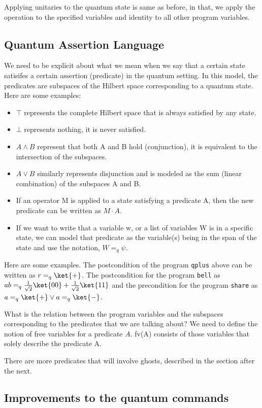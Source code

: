 \documentclass[acmsmall,nonacm,timestamp,review=false,anonymous=false]{acmart}
\begin{document}
Applying unitaries to the quantum state is same as before, in that, we apply the operation to the specified variables and identity to all other program variables.

\subsection{Quantum Assertion Language}
We need to be explicit about what we mean when we say that a certain state satisifes a certain assertion (predicate) in the quantum setting. In this model, the predicates are subspaces of the Hilbert space corresponding to a quantum state. Here are some examples:
\begin{itemize}
	\item $\top$ represents the complete Hilbert space that is always satisfied by any state.
	\item $\bot$ represents nothing, it is never satisfied.
	\item $A \wedge B$ represent that both A and B hold (conjunction), it is equivalent to the intersection of the subspaces.
	\item $A \vee B$ similarly represents disjunction and is modeled as the sum (linear combination) of the subspaces A and B.
	\item If an operator M is applied to a state satisfying a predicate A, then the new predicate can be written as $M \cdot A$.
	\item If we want to write that a variable w, or a list of variables W is in a specific state, we can model that predicate as the variable(s) being in the span of the state and use the notation, $W =_q \psi$.
\end{itemize}

Here are some examples. The postcondition of the program \texttt{qplus} above can be written as $r =_q \ket{+}$. The postcondition for the program \texttt{bell} as $ab =_q \frac{1}{\sqrt{2}}\ket{00}+\frac{1}{\sqrt{2}}\ket{11}$ and the precondition for the program \texttt{share} as $a =_q \ket{+} \vee a =_q \ket{-}$.

What is the relation between the program variables and the subspaces corresponding to the predicates that we are talking about? We need to define the notion of free variables for a predicate $A$. fv(A) consists of those variables that solely describe the predicate A.

There are more predicates that will involve ghosts, described in the section after the next.

\subsection{Improvements to the quantum commands}
\end{document}
